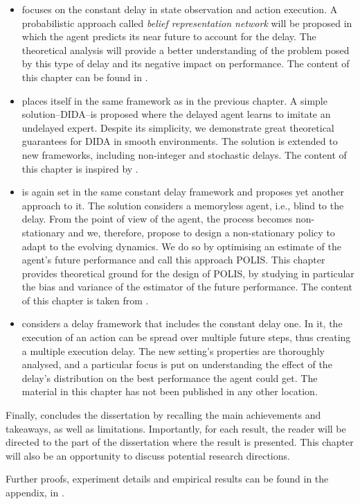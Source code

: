 \begin{itemize}
    \item {} focuses on the constant delay in state observation and action execution. A probabilistic approach called \emph{belief representation network} will be proposed in which the agent predicts its near future to account for the delay. 
    The theoretical analysis will provide a better understanding of the problem posed by this type of delay and its negative impact on performance.
    The content of this chapter can be found in \cite{liotet2021learning}.
    \item {} places itself in the same framework as in the previous chapter. 
    A simple solution--{DIDA}--is proposed where the delayed agent learns to imitate an undelayed expert. 
    Despite its simplicity, we demonstrate great theoretical guarantees for DIDA in smooth environments. 
    The solution is extended to new frameworks, including non-integer and stochastic delays.
    The content of this chapter is inspired by \cite{liotet2022delayed}.
    \item {} is again set in the same constant delay framework and proposes yet another approach to it.
    The solution considers a memoryless agent, i.e., blind to the delay.
    From the point of view of the agent, the process becomes non-stationary and we, therefore, propose to design a non-stationary policy to adapt to the evolving dynamics. 
    We do so by optimising an estimate of the agent's future performance and call this approach POLIS.
    This chapter provides theoretical ground for the design of POLIS, by studying in particular the bias and variance of the estimator of the future performance. 
    The content of this chapter is taken from \cite{liotet2022lifelong}.
    \item {} considers a delay framework that includes the constant delay one.
    In it, the execution of an action can be spread over multiple future steps, thus creating a multiple execution delay.
    The new setting's properties are thoroughly analysed, and a particular focus is put on understanding the effect of the delay's distribution on the best performance the agent could get. 
    The material in this chapter has not been published in any other location.
\end{itemize}

Finally,  concludes the dissertation by recalling the main achievements and takeaways, as well as limitations.
Importantly, for each result, the reader will be directed to the part of the dissertation where the result is presented. 
This chapter will also be an opportunity to discuss potential research directions.

Further proofs, experiment details and empirical results can be found in the appendix, in .